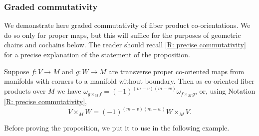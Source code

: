 \subsubsection{Graded commutativity}

We demonstrate here graded commutativity of fiber product co-orientations.
We do so only for proper maps, but this will suffice for the purposes of geometric chains and cochains below.
The reader should recall \cref{R: precise commutativity} for a precise explanation of the statement of the proposition.

\begin{proposition}\label{P: graded comm}
	Suppose $f \colon V \to M$ and $g \colon W \to M$ are transverse proper co-oriented maps from manifolds with corners to a manifold without boundary.
	Then as co-oriented fiber products over $M$ we have $\omega_{g \times_M f} = (-1)^{(m-v)(m-w)} \omega_{f \times_M g}$, or, using Notation \ref{R: precise commutativity},
	$$V \times_M W = (-1)^{(m-v)(m-w)} W \times_M V.$$
\end{proposition}

Before proving the proposition, we put it to use in the following example.

